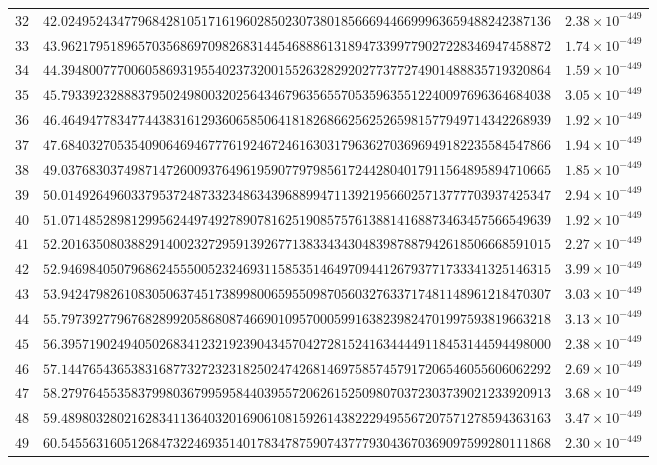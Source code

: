 \documentclass[12pt,reqno]{amsart}
\theoremstyle{remark}
\begin{document}
\begin{longtable}{clc}
$32$ & $42.0249524347796842810517161960285023073801856669446699963659488242387136$ & $2.38\times 10^{-449}$ \\
$33$ & $43.9621795189657035686970982683144546888613189473399779027228346947458872$ & $1.74\times 10^{-449}$ \\
$34$ & $44.3948007770060586931955402373200155263282920277377274901488835719320864$ & $1.59\times 10^{-449}$ \\
$35$ & $45.7933923288837950249800320256434679635655705359635512240097696364684038$ & $3.05\times 10^{-449}$ \\
$36$ & $46.4649477834774438316129360658506418182686625625265981577949714342268939$ & $1.92\times 10^{-449}$ \\
$37$ & $47.6840327053540906469467776192467246163031796362703696949182235584547866$ & $1.94\times 10^{-449}$ \\
$38$ & $49.0376830374987147260093764961959077979856172442804017911564895894710665$ & $1.85\times 10^{-449}$ \\
$39$ & $50.0149264960337953724873323486343968899471139219566025713777703937425347$ & $2.94\times 10^{-449}$ \\
$40$ & $51.0714852898129956244974927890781625190857576138814168873463457566549639$ & $1.92\times 10^{-449}$ \\
$41$ & $52.2016350803882914002327295913926771383343430483987887942618506668591015$ & $2.27\times 10^{-449}$ \\
$42$ & $52.9469840507968624555005232469311585351464970944126793771733341325146315$ & $3.99\times 10^{-449}$ \\
$43$ & $53.9424798261083050637451738998006595509870560327633717481148961218470307$ & $3.03\times 10^{-449}$ \\
$44$ & $55.7973927796768289920586808746690109570005991638239824701997593819663218$ & $3.13\times 10^{-449}$ \\
$45$ & $56.3957190249405026834123219239043457042728152416344449118453144594498000$ & $2.38\times 10^{-449}$ \\
$46$ & $57.1447654365383168773272323182502474268146975857457917206546055606062292$ & $2.69\times 10^{-449}$ \\
$47$ & $58.2797645535837998036799595844039557206261525098070372303739021233920913$ & $3.68\times 10^{-449}$ \\
$48$ & $59.4898032802162834113640320169061081592614382229495567207571278594363163$ & $3.47\times 10^{-449}$ \\
$49$ & $60.5455631605126847322469351401783478759074377793043670369097599280111868$ & $2.30\times 10^{-449}$ \\

\end{longtable}
\end{document}
